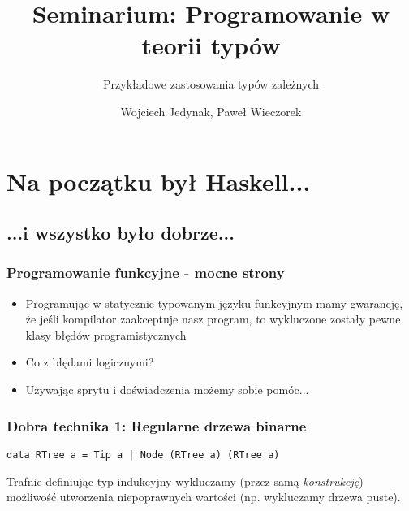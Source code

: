 \documentclass{beamer}
\title{Seminarium: Programowanie w teorii typów}
\subtitle{Przykładowe zastosowania typów zależnych}
\author{Wojciech Jedynak, Paweł Wieczorek}
\institute{Instytut Informatyki Uniwersytetu Wrocławskiego}
\begin{document}
\lstset{language=Haskell}

\maketitle




\section{Na początku był Haskell...}
\subsection{...i wszystko było dobrze...}

\begin{frame}

\frametitle{Programowanie funkcyjne - mocne strony}

\begin{itemize}

\item Programując w statycznie typowanym języku funkcyjnym mamy gwarancję,
że jeśli kompilator zaakceptuje nasz program, to wykluczone zostały
pewne klasy błędów programistycznych 
\item Co z błędami logicznymi?
\item Używając sprytu i doświadczenia możemy sobie pomóc...
\end{itemize}

\end{frame}


\begin{frame}[fragile]
\frametitle{Dobra technika 1: Regularne drzewa binarne}

\begin{lstlisting}
data RTree a = Tip a | Node (RTree a) (RTree a)
\end{lstlisting}

Trafnie definiując typ indukcyjny wykluczamy (przez samą \emph{konstrukcję}) 
możliwość utworzenia 
niepoprawnych wartości (np. wykluczamy drzewa puste).

\end{frame}

\end{document}
